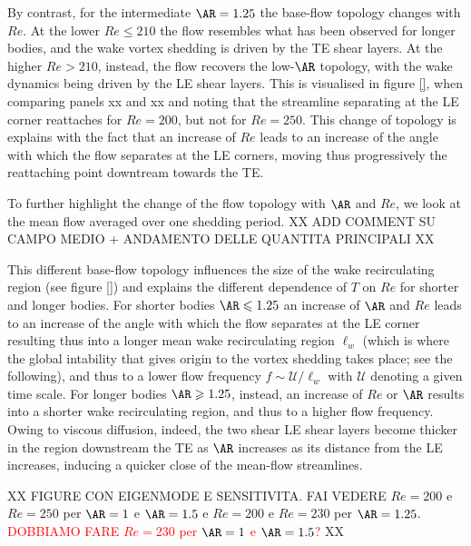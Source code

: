 By contrast, for the intermediate $\AR=1.25$ the base-flow topology changes with $Re$. At the lower $Re \le 210$ the flow resembles what has been observed for longer bodies, and the wake vortex shedding is driven by the TE shear layers. At the higher $Re>210$, instead, the flow recovers the low-$\AR$ topology, with the wake dynamics being driven by the LE shear layers. This is visualised in figure \ref{}, when comparing panels xx and xx and noting that the streamline separating at the LE corner reattaches for $Re=200$, but not for $Re=250$. This change of topology is explains with the fact that an increase of $Re$ leads to an increase of the angle with which the flow separates at the LE corners, moving thus progressively the reattaching point downtream towards the TE.

To further highlight the change of the flow topology with $\AR$ and $Re$, we look at the mean flow averaged over one shedding period. XX ADD COMMENT SU CAMPO MEDIO + ANDAMENTO DELLE QUANTITA PRINCIPALI XX


 This different base-flow topology influences the size of the wake recirculating region (see figure \ref{}) and explains the different dependence of $T$ on $Re$ for shorter and longer bodies. For shorter bodies $\AR \le 1.25$ an increase of $\AR$ and $Re$ leads to an increase of the angle with which the flow separates at the LE corner resulting thus into a longer mean wake recirculating region $\ell_w$ (which is where the global intability that gives origin to the vortex shedding takes place; see the following), and thus to a lower flow frequency $f \sim \mathcal{U}/\ell_w$ with $\mathcal{U}$ denoting a given time scale. For longer bodies $\AR \ge 1.25$, instead, an increase of $Re$ or $\AR$ results into a shorter wake recirculating region, and thus to a higher flow frequency. Owing to viscous diffusion, indeed, the two shear LE shear layers become thicker in the region downstream the TE as $\AR$ increases as its distance from the LE increases, inducing a quicker close of the mean-flow streamlines. 
  
XX FIGURE CON EIGENMODE E SENSITIVITA. FAI VEDERE $Re=200$ e $Re=250$ per $\AR=1$ e $\AR=1.5$ e $Re=200$ e $Re=230$ per $\AR=1.25$. \textcolor{red}{DOBBIAMO FARE $Re=230$ per $\AR=1$ e $\AR=1.5$?} XX

